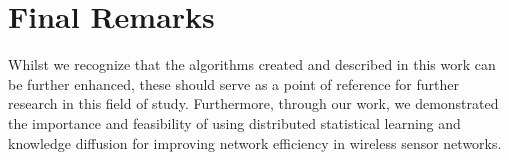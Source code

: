 \documentclass{mproj}
\begin{document}
\section{Final Remarks}
Whilst we recognize that the algorithms created and described in this work can be further enhanced, these should serve as a point of reference for further research in this field of study. Furthermore, through our work, we demonstrated the importance and feasibility of using distributed statistical learning and knowledge diffusion for improving network efficiency in wireless sensor networks.



\end{document}
